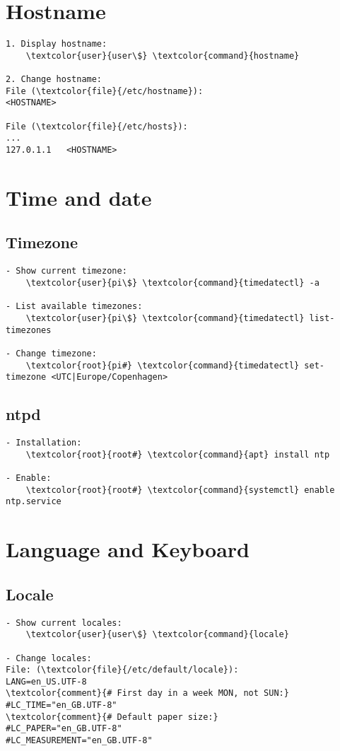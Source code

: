 \documentclass[10pt, a4paper, onecolumn, openany]{book} %
\begin{document}
\section{Hostname}
\begin{Verbatim}[commandchars=\\\{\}]
1. Display hostname:
    \textcolor{user}{user\$} \textcolor{command}{hostname}
    
2. Change hostname:
File (\textcolor{file}{/etc/hostname}):
<HOSTNAME>

File (\textcolor{file}{/etc/hosts}):
...
127.0.1.1   <HOSTNAME>
\end{Verbatim}

\section{Time and date}
\subsection{Timezone}
\begin{Verbatim}[commandchars=\\\{\}]
- Show current timezone:
    \textcolor{user}{pi\$} \textcolor{command}{timedatectl} -a

- List available timezones:
    \textcolor{user}{pi\$} \textcolor{command}{timedatectl} list-timezones
    
- Change timezone:
    \textcolor{root}{pi#} \textcolor{command}{timedatectl} set-timezone <UTC|Europe/Copenhagen>
\end{Verbatim}
\subsection{ntpd}
\begin{Verbatim}[commandchars=\\\{\}]
- Installation:
    \textcolor{root}{root#} \textcolor{command}{apt} install ntp

- Enable:
    \textcolor{root}{root#} \textcolor{command}{systemctl} enable ntp.service
\end{Verbatim}




\section{Language and Keyboard}
\subsection{Locale}
\begin{Verbatim}[commandchars=\\\{\}]
- Show current locales:
    \textcolor{user}{user\$} \textcolor{command}{locale}

- Change locales:
File: (\textcolor{file}{/etc/default/locale}):
LANG=en_US.UTF-8
\textcolor{comment}{# First day in a week MON, not SUN:}
#LC_TIME="en_GB.UTF-8"
\textcolor{comment}{# Default paper size:}
#LC_PAPER="en_GB.UTF-8"
#LC_MEASUREMENT="en_GB.UTF-8"
\end{Verbatim}
\end{document}
